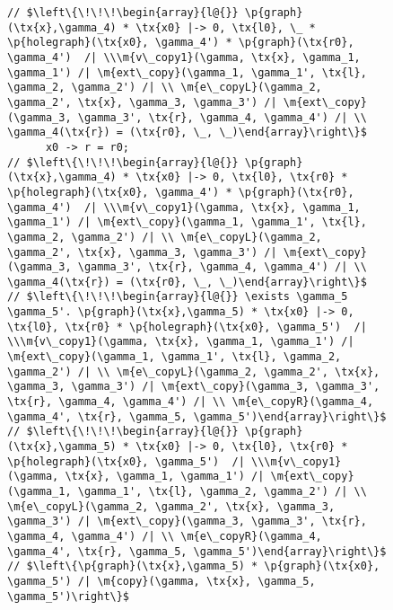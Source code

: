 \begin{figure}
  \begin{lstlisting}
// $\left\{\!\!\!\begin{array}{l@{}} \p{graph}(\tx{x},\gamma_4) * \tx{x0} |-> 0, \tx{l0}, \_ * \p{holegraph}(\tx{x0}, \gamma_4') * \p{graph}(\tx{r0}, \gamma_4')  /| \\\m{v\_copy1}(\gamma, \tx{x}, \gamma_1, \gamma_1') /| \m{ext\_copy}(\gamma_1, \gamma_1', \tx{l}, \gamma_2, \gamma_2') /| \\ \m{e\_copyL}(\gamma_2, \gamma_2', \tx{x}, \gamma_3, \gamma_3') /| \m{ext\_copy}(\gamma_3, \gamma_3', \tx{r}, \gamma_4, \gamma_4') /| \\ \gamma_4(\tx{r}) = (\tx{r0}, \_, \_)\end{array}\right\}$
      x0 -> r = r0;
// $\left\{\!\!\!\begin{array}{l@{}} \p{graph}(\tx{x},\gamma_4) * \tx{x0} |-> 0, \tx{l0}, \tx{r0} * \p{holegraph}(\tx{x0}, \gamma_4') * \p{graph}(\tx{r0}, \gamma_4')  /| \\\m{v\_copy1}(\gamma, \tx{x}, \gamma_1, \gamma_1') /| \m{ext\_copy}(\gamma_1, \gamma_1', \tx{l}, \gamma_2, \gamma_2') /| \\ \m{e\_copyL}(\gamma_2, \gamma_2', \tx{x}, \gamma_3, \gamma_3') /| \m{ext\_copy}(\gamma_3, \gamma_3', \tx{r}, \gamma_4, \gamma_4') /| \\ \gamma_4(\tx{r}) = (\tx{r0}, \_, \_)\end{array}\right\}$
// $\left\{\!\!\!\begin{array}{l@{}} \exists \gamma_5 \gamma_5'. \p{graph}(\tx{x},\gamma_5) * \tx{x0} |-> 0, \tx{l0}, \tx{r0} * \p{holegraph}(\tx{x0}, \gamma_5')  /| \\\m{v\_copy1}(\gamma, \tx{x}, \gamma_1, \gamma_1') /| \m{ext\_copy}(\gamma_1, \gamma_1', \tx{l}, \gamma_2, \gamma_2') /| \\ \m{e\_copyL}(\gamma_2, \gamma_2', \tx{x}, \gamma_3, \gamma_3') /| \m{ext\_copy}(\gamma_3, \gamma_3', \tx{r}, \gamma_4, \gamma_4') /| \\ \m{e\_copyR}(\gamma_4, \gamma_4', \tx{r}, \gamma_5, \gamma_5')\end{array}\right\}$
// $\left\{\!\!\!\begin{array}{l@{}} \p{graph}(\tx{x},\gamma_5) * \tx{x0} |-> 0, \tx{l0}, \tx{r0} * \p{holegraph}(\tx{x0}, \gamma_5')  /| \\\m{v\_copy1}(\gamma, \tx{x}, \gamma_1, \gamma_1') /| \m{ext\_copy}(\gamma_1, \gamma_1', \tx{l}, \gamma_2, \gamma_2') /| \\ \m{e\_copyL}(\gamma_2, \gamma_2', \tx{x}, \gamma_3, \gamma_3') /| \m{ext\_copy}(\gamma_3, \gamma_3', \tx{r}, \gamma_4, \gamma_4') /| \\ \m{e\_copyR}(\gamma_4, \gamma_4', \tx{r}, \gamma_5, \gamma_5')\end{array}\right\}$
// $\left\{\p{graph}(\tx{x},\gamma_5) * \p{graph}(\tx{x0}, \gamma_5') /| \m{copy}(\gamma, \tx{x}, \gamma_5, \gamma_5')\right\}$


\end{lstlisting}
\end{figure}
